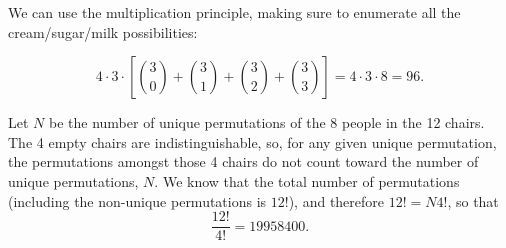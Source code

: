 
\begin{problem}{1} We can use the multiplication principle, making sure to enumerate all the cream/sugar/milk possibilities:

	\begin{equation}
		4 \cdot 3 \cdot \left[\binom{3}{0}+\binom{3}{1}+\binom{3}{2}+\binom{3}{3}\right] = 4 \cdot 3 \cdot 8 = 96.
	\end{equation}

\end{problem}

\begin{problem}{2} Let $N$ be the number of unique permutations of the 8 people in the 12 chairs.  The 4 empty chairs are indistinguishable, so, for any given unique permutation, the permutations amongst those 4 chairs do not count toward the number of unique permutations, $N$.  We know that the total  number of permutations (including the non-unique permutations is $12!$), and therefore $12! = N 4!$, so that
	\begin{equation}
		\frac{12!}{4!} = 19958400.
	\end{equation}

\end{problem}		






